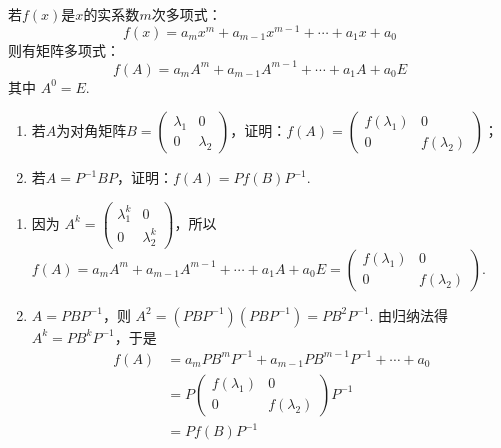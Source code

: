 \begin{exercise}
\begin{exgroup}
        \item 若$f(x)$是$x$的实系数$m$次多项式：
        \[f(x)=a_mx^m+a_{m-1}x^{m-1}+\cdots+a_1x+a_0\]
        则有矩阵多项式：
        \[f(A)=a_mA^m+a_{m-1}A^{m-1}+\cdots+a_1A+a_0E\]
        其中 $A^0=E$.
        \begin{enumerate}
            \item 若$A$为对角矩阵$B=\begin{pmatrix}
                          \lambda_1 & 0 \\ 0 & \lambda_2
                      \end{pmatrix}$，证明：$f(A)=\begin{pmatrix}
                          f(\lambda_1) & 0 \\ 0 & f(\lambda_2)
                      \end{pmatrix}$；

            \item 若$A=P^{-1}BP$，证明：$f(A)=Pf(B)P^{-1}$.
        \end{enumerate}
        \begin{answer}
            \begin{enumerate}
                \item 因为 $A^k=\begin{pmatrix}\lambda_1^k & 0 \\ 0 & \lambda_2^k\end{pmatrix}$，所以 $f(A)=a_mA^m+a_{m-1}A^{m-1}+\cdots+a_1A+a_0E = \begin{pmatrix}f(\lambda_1) & 0 \\ 0 & f(\lambda_2)\end{pmatrix}$.
                \item $A=PBP^{-1}$，则 $A^2=(PBP^{-1})(PBP^{-1})=PB^2P^{-1}$. 由归纳法得 $A^k=PB^kP^{-1}$，于是
                      \begin{align*}
                          f(A) & = a_mPB^mP^{-1}+a_{m-1}PB^{m-1}P^{-1}+\cdots+a_0                         \\
                               & =P\begin{pmatrix}f(\lambda_1) & 0 \\ 0 & f(\lambda_2)\end{pmatrix}P^{-1} \\
                               & =Pf(B)P^{-1}
                      \end{align*}
            \end{enumerate}
        \end{answer}


\end{exgroup}
\end{exercise}

